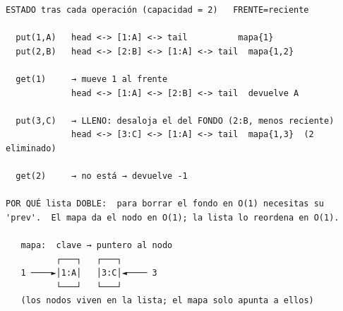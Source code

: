 \begin{dsacomofunciona}
\begin{verbatim}
ESTADO tras cada operación (capacidad = 2)   FRENTE=reciente

  put(1,A)   head <-> [1:A] <-> tail          mapa{1}
  put(2,B)   head <-> [2:B] <-> [1:A] <-> tail  mapa{1,2}

  get(1)     → mueve 1 al frente
             head <-> [1:A] <-> [2:B] <-> tail  devuelve A

  put(3,C)   → LLENO: desaloja el del FONDO (2:B, menos reciente)
             head <-> [3:C] <-> [1:A] <-> tail  mapa{1,3}  (2 eliminado)

  get(2)     → no está → devuelve -1

POR QUÉ lista DOBLE:  para borrar el fondo en O(1) necesitas su
'prev'.  El mapa da el nodo en O(1); la lista lo reordena en O(1).

   mapa:  clave → puntero al nodo
          ┌───┐   ┌───┐
   1 ────►│1:A│   │3:C│◄──── 3
          └───┘   └───┘
   (los nodos viven en la lista; el mapa solo apunta a ellos)
\end{verbatim}
\end{dsacomofunciona}


